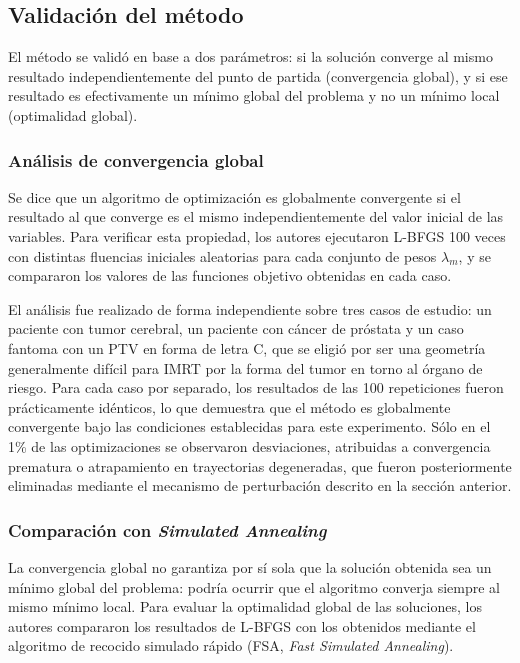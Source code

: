 \subsection{Validación del método}

El método se validó en base a dos parámetros: si la solución converge al mismo resultado independientemente del punto de partida (convergencia global), y si ese resultado es efectivamente un mínimo global del problema y no un mínimo local (optimalidad global).

\subsubsection*{Análisis de convergencia global}

Se dice que un algoritmo de optimización es globalmente convergente si el resultado al que converge es el mismo independientemente del valor inicial de las variables. Para verificar esta propiedad, los autores ejecutaron L-BFGS 100 veces con distintas fluencias iniciales aleatorias para cada conjunto de pesos \(\lambda_m\), y se compararon los valores de las funciones objetivo obtenidas en cada caso.

El análisis fue realizado de forma independiente sobre tres casos de estudio: un paciente con tumor cerebral, un paciente con cáncer de próstata y un caso fantoma con un PTV en forma de letra C, que se eligió por ser una geometría generalmente difícil para IMRT por la forma del tumor en torno al órgano de riesgo. Para cada caso por separado, los resultados de las 100 repeticiones fueron prácticamente idénticos, lo que demuestra que el método es globalmente convergente bajo las condiciones establecidas para este experimento. Sólo en el 1\% de las optimizaciones se observaron desviaciones, atribuidas a convergencia prematura o atrapamiento en trayectorias degeneradas, que fueron posteriormente eliminadas mediante el mecanismo de perturbación descrito en la sección anterior.

\subsubsection*{Comparación con \textit{Simulated Annealing}}

La convergencia global no garantiza por sí sola que la solución obtenida sea un mínimo global del problema: podría ocurrir que el algoritmo converja siempre al mismo mínimo local. Para evaluar la optimalidad global de las soluciones, los autores compararon los resultados de L-BFGS con los obtenidos mediante el algoritmo de recocido simulado rápido (FSA, \textit{Fast Simulated Annealing}).

